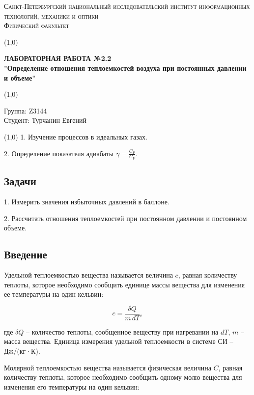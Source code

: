 \documentclass[a4paper]{article}
\begin{document}
\begin{center}
\textsc{Санкт-Петербургский национальный исследовательский институт информационных технологий, механики и оптики\\[3mm]
Физический факультет} \\[3mm]

\end{center}
\vspace{5mm}
\line(1,0){\textwidth}
\begin{center}
\textbf{ЛАБОРАТОРНАЯ РАБОТА №2.2\\}
\textbf{"Определение отношения теплоемкостей
воздуха при постоянных давлении и объеме"}
\end{center}
\vspace{2mm}
\line(1,0){\textwidth}
\vspace{5mm}
\begin{minipage}{0.4\textwidth}
    Группа: Z3144 \\
    Студент: Турчанин Евгений\\
    \vspace{1mm}
\end{minipage}
\hfill
\vspace{1mm}
\line(1,0){\textwidth}
1. Изучение процессов в идеальных газах.

2. Определение показателя адиабаты \(\gamma = \frac{C_P}{C_V}\).

\subsection*{Задачи}
1. Измерить значения избыточных давлений в баллоне.

2. Рассчитать отношения теплоемкостей при постоянном давлении и постоянном объеме.

\subsection*{Введение}
Удельной теплоемкостью вещества называется величина \(c\), равная количеству теплоты, которое необходимо сообщить единице массы вещества для изменения ее температуры на один кельвин:

\[
c = \frac{\delta Q}{m \, dT},
\]


где \(\delta Q\) – количество теплоты, сообщенное веществу при нагревании на \(dT\), \(m\) – масса вещества. Единица измерения удельной теплоемкости в системе СИ – Дж/(кг·К).

Молярной теплоемкостью вещества называется физическая величина \(C\), равная количеству теплоты, которое необходимо сообщить одному молю вещества для изменения его температуры на один кельвин:
\end{document}
